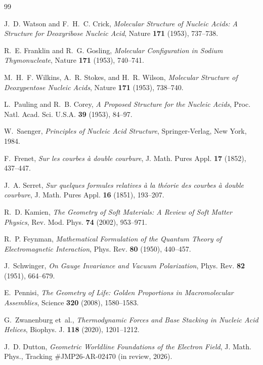 \documentclass[11pt,a4paper]{article}
\begin{document}
\begin{thebibliography}{99}

J.~D. Watson and F.~H.~C. Crick, \emph{Molecular Structure of Nucleic Acids: A Structure for Deoxyribose Nucleic Acid}, Nature \textbf{171} (1953), 737--738.

R.~E. Franklin and R.~G. Gosling, \emph{Molecular Configuration in Sodium Thymonucleate}, Nature \textbf{171} (1953), 740--741.

M.~H.~F. Wilkins, A.~R. Stokes, and H.~R. Wilson, \emph{Molecular Structure of Deoxypentose Nucleic Acids}, Nature \textbf{171} (1953), 738--740.

L.~Pauling and R.~B. Corey, \emph{A Proposed Structure for the Nucleic Acids}, Proc. Natl. Acad. Sci. U.S.A. \textbf{39} (1953), 84--97.

W.~Saenger, \emph{Principles of Nucleic Acid Structure}, Springer-Verlag, New York, 1984.

F.~Frenet, \emph{Sur les courbes \`a double courbure}, J. Math. Pures Appl. \textbf{17} (1852), 437--447.

J.~A. Serret, \emph{Sur quelques formules relatives \`a la th\'eorie des courbes \`a double courbure}, J. Math. Pures Appl. \textbf{16} (1851), 193--207.

R.~D. Kamien, \emph{The Geometry of Soft Materials: A Review of Soft Matter Physics}, Rev. Mod. Phys. \textbf{74} (2002), 953--971.

R.~P. Feynman, \emph{Mathematical Formulation of the Quantum Theory of Electromagnetic Interaction}, Phys. Rev. \textbf{80} (1950), 440--457.

J.~Schwinger, \emph{On Gauge Invariance and Vacuum Polarization}, Phys. Rev. \textbf{82} (1951), 664--679.

E.~Pennisi, \emph{The Geometry of Life: Golden Proportions in Macromolecular Assemblies}, Science \textbf{320} (2008), 1580--1583.

G.~Zwanenburg et~al., \emph{Thermodynamic Forces and Base Stacking in Nucleic Acid Helices}, Biophys. J. \textbf{118} (2020), 1201--1212.

J.~D. Dutton, \emph{Geometric Worldline Foundations of the Electron Field}, J. Math. Phys., Tracking \#JMP26-AR-02470 (in review, 2026).


\end{thebibliography}
\end{document}
